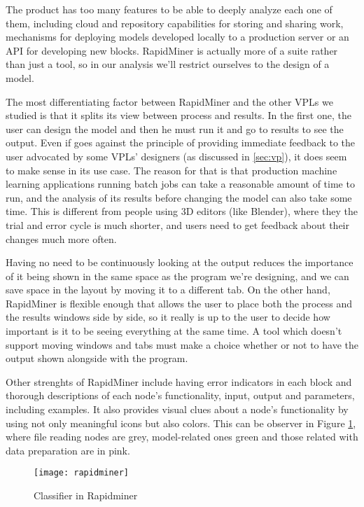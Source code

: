 \begin{itemsize}
The product has too many features to be able to deeply analyze each one of them,
including cloud and repository capabilities for storing and sharing work,
mechanisms for deploying models developed locally to a production server or
an API for developing new blocks. RapidMiner is actually more of a suite rather
than just a tool, so in our analysis we'll restrict ourselves to the design of
a model.

The most differentiating factor between RapidMiner and the other VPLs we studied
is that it splits its view between process and results. In the first one, the
user can design the model and then he must run it and go to results to see the output.
Even if goes against the principle of providing immediate feedback to the user
advocated by some VPLs' designers (as discussed in \ref{sec:vp}), it does seem to make
sense in its use case. The reason for that is that production machine learning applications
running batch jobs can take a reasonable amount of time to run, and the analysis
of its results before changing the model can also take some time. This is
different from people using 3D editors (like Blender), where they the trial and
error cycle is much shorter, and users need to get feedback about their changes
much more often.

Having no need to be continuously looking at the output reduces the importance
of it being shown in the same space as the program we're designing, and we can
save space in the layout by moving it to a different tab. On the other hand,
RapidMiner is flexible enough that allows the user to place both the process
and the results windows side by side, so it really is up to the user to decide
how important is it to be seeing everything at the same time. A tool which doesn't
support moving windows and tabs must make a choice whether or not to have the
output shown alongside with the program.

Other strenghts of RapidMiner include having error indicators in each block
and thorough descriptions of each
node's functionality, input, output and parameters, including examples. It also
provides visual clues about a node's functionality by using not only meaningful
icons but also colors. This can be observer in Figure \ref{fig:rapidminer},
where file reading nodes are grey, model-related ones green and those related
with data preparation are in pink.

\begin{figure}[t]
  \begin{center}
    \leavevmode
    \texttt{[image: rapidminer]}
    \caption{Classifier in Rapidminer \cite{rapidminer}}
    \label{fig:rapidminer}
  \end{center}
\end{figure}


\end{itemsize}
